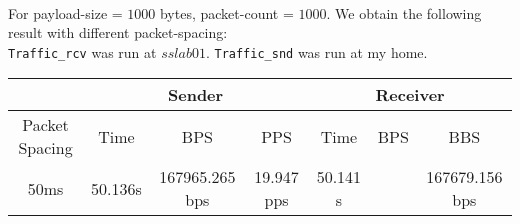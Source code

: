\documentclass[12pt]{article}
\newenvironment{problem}[2][Problem]{\begin{trivlist}
\item[\hskip \labelsep {\bfseries #1}\hskip \labelsep {\bfseries #2.}]}{\end{trivlist}}
\begin{document}
\begin{problem}{2} \ \\
For payload-size = $1000$ bytes, packet-count = $1000$. We obtain the following result with different packet-spacing:\\
\texttt{Traffic\_rcv} was run at $sslab01$. \texttt{Traffic\_snd} was run at my home. 
\begin{center}
	\begin{tabular}{|c|c|c|c|c|c|c|}
	\hline 
	& \multicolumn{3}{|c|}{Sender} & \multicolumn{3}{|c|}{Receiver}\\ \hline
	Packet Spacing 		   & Time& BPS& PPS& Time &BPS& BBS\\ \hline
	50ms 		  		   & 50.136s &  167965.265 bps& 19.947 pps & 50.141 s & &167679.156 bps\\ \hline

	\end{tabular}
\end{center}
\end{problem}
\begin{problem}{3}
\end{problem}
\end{document}
